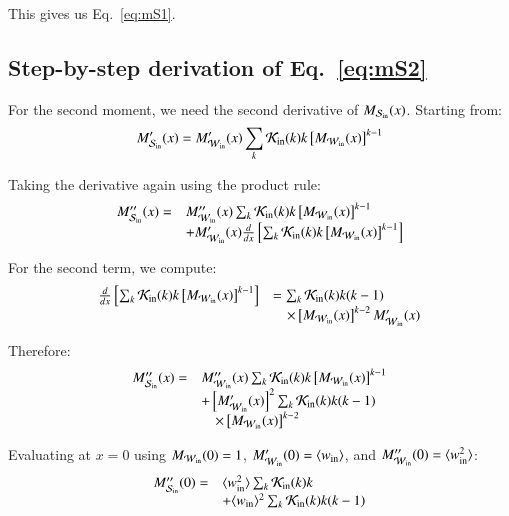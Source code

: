 \documentclass[a4paper,pre,superscriptaddress,floatfix,nofootinbib,twocolumn]{revtex4-1}
\begin{document}
This gives us Eq.~\eqref{eq:mS1}.

\subsection*{Step-by-step derivation of Eq.~\eqref{eq:mS2}}

For the second moment, we need the second derivative of $M_{{\cal S}_\text{in}}(x)$. Starting from:
\[
M'_{{\cal S}_\text{in}}(x) = M'_{{\cal W}_\text{in}}(x) \sum_{k} {\cal K}_\text{in}(k) k \left[ M_{{\cal W}_\text{in}}(x) \right]^{k-1}
\]

Taking the derivative again using the product rule:
\[
\begin{array}{ll}
M''_{{\cal S}_\text{in}}(x) = & M''_{{\cal W}_\text{in}}(x) \sum_{k} {\cal K}_\text{in}(k) k \left[ M_{{\cal W}_\text{in}}(x) \right]^{k-1} \\
& + M'_{{\cal W}_\text{in}}(x) \frac{d}{dx}\left[\sum_{k} {\cal K}_\text{in}(k) k \left[ M_{{\cal W}_\text{in}}(x) \right]^{k-1}\right]
\end{array}
\]

For the second term, we compute:
\[
\begin{array}{ll}
\frac{d}{dx}\left[\sum_{k} {\cal K}_\text{in}(k) k \left[ M_{{\cal W}_\text{in}}(x) \right]^{k-1}\right] & = \sum_{k} {\cal K}_\text{in}(k) k (k-1) \\
& \quad \times \left[ M_{{\cal W}_\text{in}}(x) \right]^{k-2} M'_{{\cal W}_\text{in}}(x)
\end{array}
\]

Therefore:
\[
\begin{array}{ll}
M''_{{\cal S}_\text{in}}(x) = & M''_{{\cal W}_\text{in}}(x) \sum_{k} {\cal K}_\text{in}(k) k \left[ M_{{\cal W}_\text{in}}(x) \right]^{k-1} \\
& + \left[M'_{{\cal W}_\text{in}}(x)\right]^2 \sum_{k} {\cal K}_\text{in}(k) k(k-1) \\
& \quad \times \left[ M_{{\cal W}_\text{in}}(x) \right]^{k-2}
\end{array}
\]

Evaluating at $x = 0$ using $M_{{\cal W}_\text{in}}(0) = 1$, $M'_{{\cal W}_\text{in}}(0) = \langle w_\text{in} \rangle$, and $M''_{{\cal W}_\text{in}}(0) = \langle w^2_\text{in} \rangle$:
\[
\begin{array}{ll}
M''_{{\cal S}_\text{in}}(0) = & \langle w^2_\text{in} \rangle \sum_{k} {\cal K}_\text{in}(k) k \\
& + \langle w_\text{in} \rangle^2 \sum_{k} {\cal K}_\text{in}(k) k(k-1)
\end{array}
\]
\end{document}
